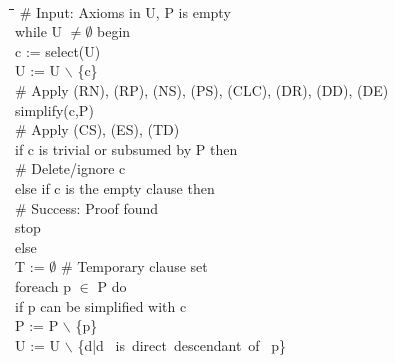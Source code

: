 \documentclass{report}
\begin{document}
\begin{figure}[hp]
  \begin{center}
    \tt
    \begin{tabbing}
      \quad\quad \= \quad\quad \= \quad\quad \=  \quad\quad \= \quad\quad \= \kill
      \# Input: Axioms in U, P is empty\\
      while U $\not= \emptyset{}$ begin\+\\
        c := select(U)\\
        U := U $\backslash$ \{c\}\\

        \# Apply (RN), (RP), (NS), (PS), (CLC), (DR), (DD), (DE)\\
        simplify(c,P)\\
        \# Apply (CS), (ES), (TD)\\
        if c is trivial or subsumed by P then\+\\
          \# Delete/ignore c\-\\
        else if c is the empty clause then\+\\
          \# Success: Proof found\\
          stop\-\\
        else\+\\
          T := $\emptyset{}$ \# Temporary clause set\\
          foreach p $\in$ P do\+\\
            if p can be simplified with c \+\\
              P := P $\backslash$ \{p\}\\
              U := U $\backslash$ \{d|d \mbox{ is direct descendant of } p\}\\


\end{tabbing}
\end{center}
\end{figure}
\end{document}

